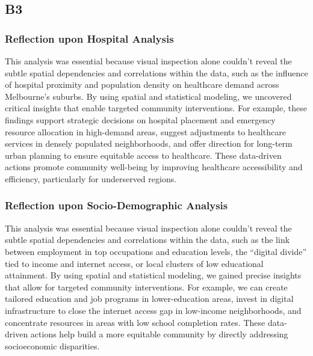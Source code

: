 \documentclass[
	a4paper, %
	10pt, %
	unnumberedsections, %
	twoside, %
]{LTJournalArticle}
\begin{document}
\subsection{B3}

\subsubsection{Reflection upon Hospital Analysis} \leavevmode
 
This analysis was essential because visual inspection alone couldn’t reveal the subtle spatial dependencies and correlations within the data, such as the influence of hospital proximity and population density on healthcare demand across Melbourne’s suburbs. By using spatial and statistical modeling, we uncovered critical insights that enable targeted community interventions. For example, these findings support strategic decisions on hospital placement and emergency resource allocation in high-demand areas, suggest adjustments to healthcare services in densely populated neighborhoods, and offer direction for long-term urban planning to ensure equitable access to healthcare. These data-driven actions promote community well-being by improving healthcare accessibility and efficiency, particularly for underserved regions.

\subsubsection{Reflection upon Socio-Demographic Analysis}\leavevmode

This analysis was essential because visual inspection alone couldn’t reveal the subtle spatial dependencies and correlations within the data, such as the link between employment in top occupations and education levels, the “digital divide” tied to income and internet access, or local clusters of low educational attainment. By using spatial and statistical modeling, we gained precise insights that allow for targeted community interventions. For example, we can create tailored education and job programs in lower-education areas, invest in digital infrastructure to close the internet access gap in low-income neighborhoods, and concentrate resources in areas with low school completion rates. These data-driven actions help build a more equitable community by directly addressing socioeconomic disparities.





\pagebreak
\end{document}
